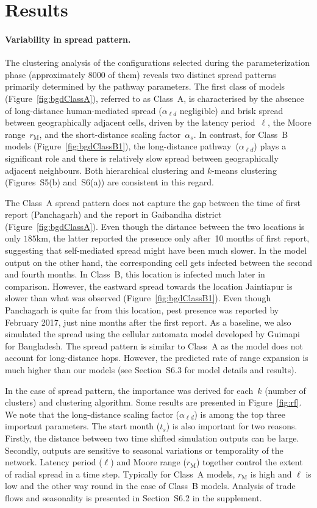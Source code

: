 \documentclass[11pt]{article}
\newcommand{\asd}{\alpha_s}
\newcommand{\ald}{\alpha_{\ell d}}
\newcommand{\mooreRange}{r_\mathrm{M}}
\theoremstyle{definition}
\begin{document}
\section{Results}
\paragraph{Variability in spread pattern.} The clustering analysis of the
configurations selected during the parameterization phase (approximately
8000 of them) reveals two distinct spread patterns primarily determined by
the pathway parameters.  The first class of models
(Figure~\ref{fig:bgdClassA}), referred to as Class~A, is characterised by
the absence of long-distance human-mediated spread ($\ald$ negligible) and
brisk spread between geographically adjacent cells, driven by the latency
period~$\ell$, the Moore range~$\mooreRange$, and the short-distance scaling
factor~$\asd$. In contrast, for Class~B models
(Figure~\ref{fig:bgdClassB1}), the long-distance pathway~($\ald$) plays a
significant role  and there is relatively slow spread between
geographically adjacent neighbours. Both hierarchical clustering and
$k$-means clustering (Figures~S5(b) and~S6(a)) are consistent in this
regard.

The Class~A spread pattern does not capture the gap between the time of first
report (Panchagarh) and the report in Gaibandha district
(Figure~\ref{fig:bgdClassA}). Even though the distance between the two
locations is only $185$km, the latter reported the presence only after~10
months of first report, suggesting that self-mediated spread might have been
much slower. In the model output on the other hand, the corresponding cell
gets infected between the second and fourth months.  In Class~B, this
location is infected much later in comparison. However, the eastward spread
towards the location Jaintiapur is slower than what was observed
(Figure~\ref{fig:bgdClassB1}). Even though Panchagarh is quite far from
this location, pest presence was reported by February 2017, just nine
months after the first report.  As a baseline, we also simulated the spread
using the cellular automata model developed by
Guimapi~\cite{guimapi2016modeling} for Bangladesh. The spread pattern is
similar to Class~A as the model does not account for long-distance hops.
However, the predicted rate of range expansion is much higher than our
models (see Section~S6.3 for model details and results).

In the case of spread pattern, the
importance was derived for each~$k$ (number of clusters) and clustering
algorithm. Some results are presented in Figure~\ref{fig:rf}. We note that
the long-distance scaling factor ($\ald$) is among the top three important
parameters. The start month ($t_s$) is also important for two reasons.
Firstly, the distance between two time shifted simulation outputs can be
large. Secondly, outputs are sensitive to seasonal variations or
temporality of the network.  Latency period ($\ell$) and Moore range
($\mooreRange$) together control the extent of radial spread in a time
step. Typically for Class~A models, $\mooreRange$ is high and $\ell$ is
low and the other way round in the case of Class~B models. Analysis of
trade flows and seasonality is presented in
Section~S6.2 in the supplement.
\end{document}
